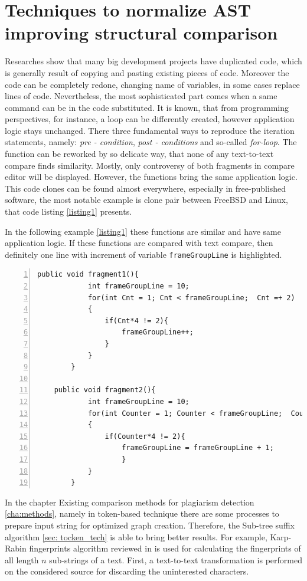 \documentclass{report}
\begin{document}
\chapter{Techniques to normalize AST improving structural comparison}
\label{cha:ast_normal}
Researches show that many big development projects have duplicated code, which is generally result of copying and pasting existing pieces of code. Moreover the code can be completely redone, changing name of variables, in some cases replace lines of code. Nevertheless, the most sophisticated part comes when a same command can be in the code substituted. It is known, that from programming perspectives, for instance, a loop can be differently created, however application logic stays unchanged. There three fundamental ways to reproduce the iteration statements, namely: \emph{pre - condition}, \emph{post - conditions} and so-called \emph{for-loop}. The function can be reworked by so delicate way, that none of any text-to-text compare finds similarity. Mostly, only controversy of both fragments in compare editor will be displayed.
However, the functions bring the same application logic. This code clones can be found almost everywhere, especially in free-published software, the most notable example is clone pair between FreeBSD and Linux, that code listing \ref{listing1} presents. 

In the following example \ref{listing1} these functions are similar and have same application logic. If these functions are compared with text compare, then definitely one line with increment of variable \texttt{frameGroupLine} is highlighted. 
\newpage
\begin{lstlisting}[caption={Clone pair between FreeBSD and Linux}, label = listing1, numbers=left, numbersep=-5pt]
	public void fragment1(){
			int frameGroupLine = 10;
			for(int Cnt = 1; Cnt < frameGroupLine;  Cnt =+ 2)
			{
				if(Cnt*4 != 2){
					frameGroupLine++;
				}
			}
		}
			
	public void fragment2(){
			int frameGroupLine = 10;
			for(int Counter = 1; Counter < frameGroupLine;  Counter =+ 2)
			{
				if(Counter*4 != 2){ 
					frameGroupLine = frameGroupLine + 1;
					}
			}
		}	
\end{lstlisting}


In the chapter Existing comparison methods for plagiarism detection \ref{cha:methods}, namely in token-based technique there are some processes to prepare input string for optimized graph creation. Therefore, the Sub-tree suffix algorithm \ref{sec: tocken_tech} is able to bring better results.
For example, Karp-Rabin fingerprints algorithm reviewed in \cite{software_clone_detection} is used for calculating the fingerprints of all
length $n$ sub-strings of a text. First, a text-to-text transformation is performed on the considered source for discarding the uninterested characters.
\end{document}
